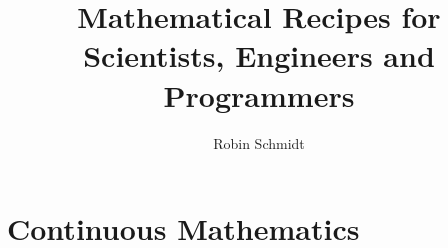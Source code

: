 



\parindent=0in
\parskip=0pt
		
 \setcounter{page}{1}

\author{Robin Schmidt}

\title{Mathematical Recipes for Scientists, Engineers and Programmers}
\maketitle


\tableofcontents


\part{Continuous Mathematics}

 




 
 
 


